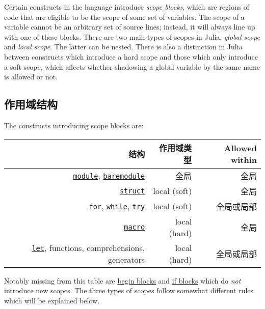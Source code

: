 Certain constructs in the language introduce \emph{scope blocks}, which are regions of code that are eligible to be the scope of some set of variables. The scope of a variable cannot be an arbitrary set of source lines; instead, it will always line up with one of these blocks. There are two main types of scopes in Julia, \emph{global scope} and \emph{local scope}. The latter can be nested. There is also a distinction in Julia between constructs which introduce a {\textquotedbl}hard scope{\textquotedbl} and those which only introduce a {\textquotedbl}soft scope{\textquotedbl}, which affects whether shadowing a global variable by the same name is allowed or not.



\hypertarget{10787034693073583413}{}


\subsection{作用域结构}



The constructs introducing scope blocks are:




\begin{table}[h]

\begin{tabulary}{\linewidth}{|R|R|R|}
\hline
结构 & 作用域类型 & Allowed within \\
\hline
\hyperlink{16285380181904025577}{\texttt{module}}, \hyperlink{13329108222158426840}{\texttt{baremodule}} & 全局 & 全局 \\
\hline
\hyperlink{4119979838407461137}{\texttt{struct}} & local (soft) & 全局 \\
\hline
\hyperlink{9105224580875818383}{\texttt{for}}, \hyperlink{15133348314455964692}{\texttt{while}}, \hyperlink{16338536928035025961}{\texttt{try}} & local (soft) & 全局或局部 \\
\hline
\hyperlink{4625593635027008869}{\texttt{macro}} & local (hard) & 全局 \\
\hline
\hyperlink{4956741936243461891}{\texttt{let}}, functions, comprehensions, generators & local (hard) & 全局或局部 \\
\hline
\end{tabulary}

\end{table}



Notably missing from this table are \hyperlink{14178955634857450370}{begin blocks} and \hyperlink{14451148373001501733}{if blocks} which do \emph{not} introduce new scopes. The three types of scopes follow somewhat different rules which will be explained below.



